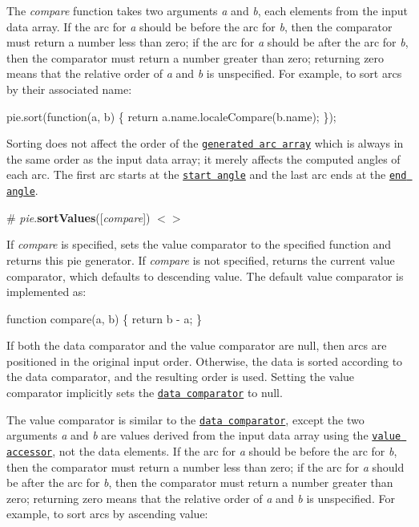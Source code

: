 The {\itshape compare} function takes two arguments {\itshape a} and {\itshape b}, each elements from the input data array. If the arc for {\itshape a} should be before the arc for {\itshape b}, then the comparator must return a number less than zero; if the arc for {\itshape a} should be after the arc for {\itshape b}, then the comparator must return a number greater than zero; returning zero means that the relative order of {\itshape a} and {\itshape b} is unspecified. For example, to sort arcs by their associated name\+:


\begin{DoxyCode}
pie.sort(function(a, b) \{ return a.name.localeCompare(b.name); \});
\end{DoxyCode}


Sorting does not affect the order of the \href{#_pie}{\tt generated arc array} which is always in the same order as the input data array; it merely affects the computed angles of each arc. The first arc starts at the \href{#pie_startAngle}{\tt start angle} and the last arc ends at the \href{#pie_endAngle}{\tt end angle}.

\label{_pie_sortValues}%
\# {\itshape pie}.{\bfseries sort\+Values}(\mbox{[}{\itshape compare}\mbox{]}) \href{https://github.com/d3/d3-shape/blob/master/src/pie.js#L58}{\tt $<$$>$}

If {\itshape compare} is specified, sets the value comparator to the specified function and returns this pie generator. If {\itshape compare} is not specified, returns the current value comparator, which defaults to descending value. The default value comparator is implemented as\+:


\begin{DoxyCode}
function compare(a, b) \{
  return b - a;
\}
\end{DoxyCode}


If both the data comparator and the value comparator are null, then arcs are positioned in the original input order. Otherwise, the data is sorted according to the data comparator, and the resulting order is used. Setting the value comparator implicitly sets the \href{#pie_sort}{\tt data comparator} to null.

The value comparator is similar to the \href{#pie_sort}{\tt data comparator}, except the two arguments {\itshape a} and {\itshape b} are values derived from the input data array using the \href{#pie_value}{\tt value accessor}, not the data elements. If the arc for {\itshape a} should be before the arc for {\itshape b}, then the comparator must return a number less than zero; if the arc for {\itshape a} should be after the arc for {\itshape b}, then the comparator must return a number greater than zero; returning zero means that the relative order of {\itshape a} and {\itshape b} is unspecified. For example, to sort arcs by ascending value\+:



